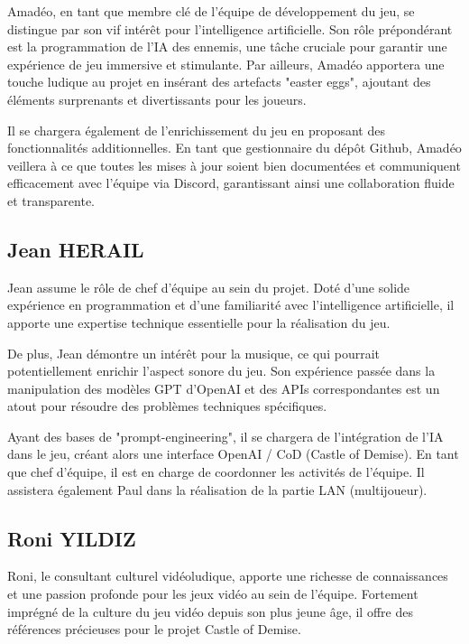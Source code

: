 \documentclass{report}
\begin{document}
	Amadéo, en tant que membre clé de l’équipe de développement du jeu, se
	distingue par son vif intérêt pour l’intelligence artificielle. Son rôle prépondérant est
	la programmation de l’IA des ennemis, une tâche cruciale pour garantir une expérience de jeu immersive et stimulante. Par ailleurs, Amadéo apportera une touche ludique au projet en insérant des artefacts "easter eggs", ajoutant des éléments surprenants et divertissants pour les joueurs. \newline
	
	 Il se chargera également de l’enrichissement du jeu en proposant des fonctionnalités additionnelles. En tant que gestionnaire du dépôt Github, Amadéo veillera à ce que toutes les mises à jour soient bien documentées et communiquent efficacement avec l’équipe via Discord, garantissant ainsi une collaboration fluide et transparente.
	 
	 
	\subsection{\normalsize Jean HERAIL}
		Jean assume le rôle de chef d’équipe au sein du projet. Doté d’une solide expérience en programmation et d’une familiarité avec l’intelligence artificielle, il apporte une expertise technique essentielle pour la réalisation du jeu. \newline 
		
		De plus, Jean démontre un intérêt pour la musique, ce qui pourrait potentiellement enrichir l’aspect sonore du jeu. Son expérience passée dans la manipulation des modèles GPT d’OpenAI et des APIs correspondantes est un atout pour résoudre des problèmes techniques spécifiques. \newline
		
		Ayant des bases de "prompt-engineering", il se chargera de l’intégration de l’IA dans le jeu, créant alors une interface OpenAI / CoD (Castle of Demise). En tant que chef d’équipe, il est en charge de coordonner les activités de l’équipe. Il assistera également Paul dans la réalisation de la partie LAN (multijoueur).
		
	\subsection{\normalsize Roni YILDIZ}
	Roni, le consultant culturel vidéoludique, apporte une richesse de connaissances
	et une passion profonde pour les jeux vidéo au sein de l’équipe. Fortement imprégné de
	la culture du jeu vidéo depuis son plus jeune âge, il offre des références précieuses pour
	le projet Castle of Demise. \newline 
	
\end{document}
